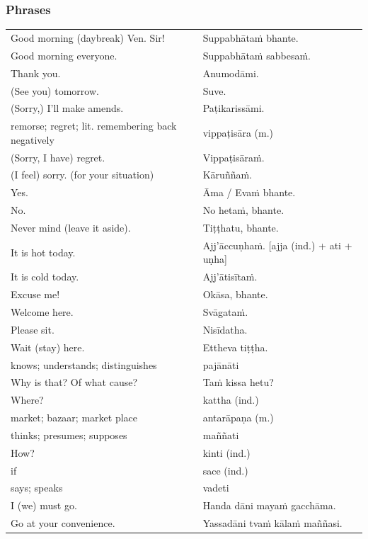 \documentclass[11pt,oneside]{memoir}
\begin{document}
\normalArrayStretch

\clearpage
\subsubsection{Phrases}
\label{sec:org3d02a74}

\begin{center}
\begin{tabular}{ll}
Good morning (daybreak) Ven. Sir! & Suppabhātaṁ bhante.\\
Good morning everyone. & Suppabhātaṁ sabbesaṁ.\\
Thank you. & Anumodāmi.\\
(See you) tomorrow. & Suve.\\
(Sorry,) I'll make amends. & Paṭikarissāmi.\\
remorse; regret; lit. remembering back negatively & vippaṭisāra (m.)\\
(Sorry, I have) regret. & Vippaṭisāraṁ.\\
(I feel) sorry. (for your situation) & Kāruññaṁ.\\
Yes. & Āma / Evaṁ bhante.\\
No. & No hetaṁ, bhante.\\
Never mind (leave it aside). & Tiṭṭhatu, bhante.\\
It is hot today. & Ajj'āccuṇhaṁ. [ajja (ind.) + ati  + uṇha]\\
It is cold today. & Ajj'ātisītaṁ.\\
Excuse me! & Okāsa, bhante.\\
Welcome here. & Svāgataṁ.\\
Please sit. & Nisīdatha.\\
Wait (stay) here. & Ettheva tiṭṭha.\\
knows; understands; distinguishes & pajānāti\\
Why is that? Of what cause? & Taṁ kissa hetu?\\
Where? & kattha (ind.)\\
market; bazaar; market place & antarāpaṇa (m.)\\
thinks; presumes; supposes & maññati\\
How? & kinti (ind.)\\
if & sace (ind.)\\
says; speaks & vadeti\\
I (we) must go. & Handa dāni mayaṁ gacchāma.\\
Go at your convenience. & Yassadāni tvaṁ kālaṁ maññasi.\\
\end{tabular}
\end{center}
\end{document}

